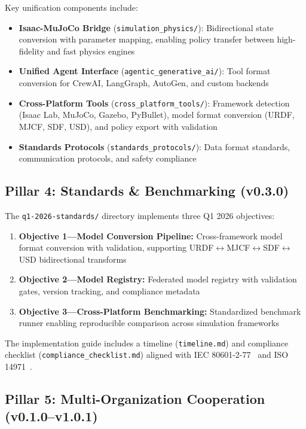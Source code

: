 \documentclass[10pt]{article}
\begin{document}
Key unification components include:
\begin{itemize}
  \item \textbf{Isaac-MuJoCo Bridge} (\texttt{simulation\_physics/}): Bidirectional state conversion with parameter mapping, enabling policy transfer between high-fidelity and fast physics engines
  \item \textbf{Unified Agent Interface} (\texttt{agentic\_generative\_ai/}): Tool format conversion for CrewAI, LangGraph, AutoGen, and custom backends
  \item \textbf{Cross-Platform Tools} (\texttt{cross\_platform\_tools/}): Framework detection (Isaac Lab, MuJoCo, Gazebo, PyBullet), model format conversion (URDF, MJCF, SDF, USD), and policy export with validation
  \item \textbf{Standards Protocols} (\texttt{standards\_protocols/}): Data format standards, communication protocols, and safety compliance
\end{itemize}

\subsection{Pillar 4: Standards \& Benchmarking (v0.3.0)}
\label{sec:standards}

The \texttt{q1-2026-standards/} directory implements three Q1 2026 objectives:

\begin{enumerate}
  \item \textbf{Objective 1---Model Conversion Pipeline:} Cross-framework model format conversion with validation, supporting URDF$\leftrightarrow$MJCF$\leftrightarrow$SDF$\leftrightarrow$USD bidirectional transforms
  \item \textbf{Objective 2---Model Registry:} Federated model registry with validation gates, version tracking, and compliance metadata
  \item \textbf{Objective 3---Cross-Platform Benchmarking:} Standardized benchmark runner enabling reproducible comparison across simulation frameworks
\end{enumerate}

The implementation guide includes a timeline (\texttt{timeline.md}) and compliance checklist (\texttt{compliance\_checklist.md}) aligned with IEC 80601-2-77~\cite{iec80601} and ISO 14971~\cite{iso14971}.

\subsection{Pillar 5: Multi-Organization Cooperation (v0.1.0--v1.0.1)}
\label{sec:cooperation}
\end{document}
